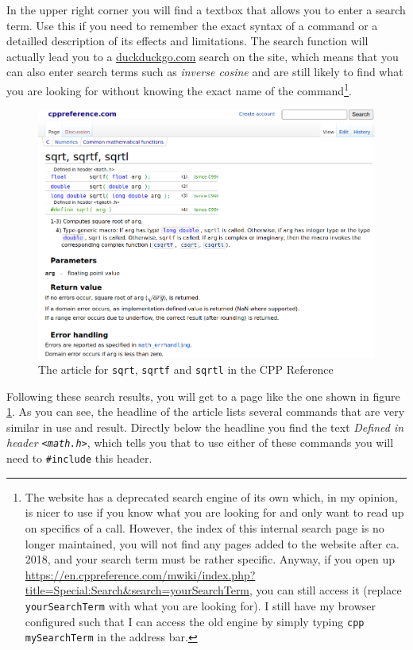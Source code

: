 In the upper right corner you will find a textbox that allows you to enter a search term. Use this if you need to remember the exact syntax of a command or a detailled description of its effects and limitations. The search function will actually lead you to a \url{duckduckgo.com} search on the site, which means that you can also enter search terms such as \emph{inverse cosine} and are still likely to find what you are looking for without knowing the exact name of the command\footnote{The website has a deprecated search engine of its own which, in my opinion, is nicer to use if you know what you are looking for and only want to read up on specifics of a call. However, the index of this internal search page is no longer maintained, \ie you will not find any pages added to the website after ca. 2018, and your search term must be rather specific. Anyway, if you open up \url{https://en.cppreference.com/mwiki/index.php?title=Special:Search&search=yourSearchTerm}, you can still access it (replace \texttt{yourSearchTerm} with what you are looking for). I still have my browser configured such that I can access the old engine by simply typing \texttt{cpp mySearchTerm} in the address bar.}.

\begin{figure}
	\includegraphics[width=\linewidth]{./gfx/cpp-sqrt}
	\caption{The article for \texttt{sqrt}, \texttt{sqrtf} and \texttt{sqrtl} in the CPP Reference} \label{fig:cpp-sqrt}
\end{figure}

Following these search results, you will get to a page like the one shown in figure \ref{fig:cpp-sqrt}. As you can see, the headline of the article lists several commands that are very similar in use and result. Directly below the headline you find the text \emph{Defined in header \texttt{<math.h>}}, which tells you that to use either of these commands you will need to \texttt{\#include} this header.

